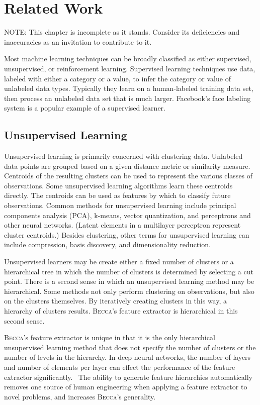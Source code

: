 \chapter{Related Work}

NOTE: This chapter is incomplete as it stands. Consider its deficiencies and inaccuracies as an invitation to contribute to it.

Most machine learning techniques can be broadly classified as either supervised, unsupervised, or reinforcement learning. Supervised learning techniques use data, labeled with either a category or a value, to infer the category or value of unlabeled data types. Typically they learn on a human-labeled training data set, then process an unlabeled data set that is much larger. Facebook's face labeling system is a popular example of a supervised learner.

\section{Unsupervised Learning}
Unsupervised learning is primarily concerned with clustering data. Unlabeled data points are grouped based on a given distance metric or similarity measure. Centroids of the resulting clusters can be used to represent the various classes of observations. Some unsupervised learning algorithms learn these centroids directly. The centroids can be used as features by which to classify future observations. Common methods for unsupervised learning include principal components analysis (PCA), k-means, vector quantization, and perceptrons and other neural networks. (Latent elements in a multilayer perceptron represent cluster centroids.) Besides clustering, other terms for unsupervised learning can include compression, basis discovery, and dimensionality reduction.

Unsupervised learners may be create either a fixed number of clusters or a hierarchical tree in which the number of clusters is determined by selecting a cut point. There is a second sense in which an unsupervised learning method may be hierarchical. Some methods not only perform clustering on observations, but also on the clusters themselves. By iteratively creating clusters in this way, a hierarchy of clusters results. \textsc{Becca}'s feature extractor is hierarchical in this second sense.

\textsc{Becca}'s feature extractor is unique in that it is the only hierarchical unsupervised learning method that does not specify the number of clusters or the number of levels in the hierarchy. In deep neural networks, the number of layers and number of elements per layer can effect the performance of the feature extractor significantly.~\cite{montavon11} The ability to generate feature hierarchies automatically removes one source of human engineering when applying a feature extractor to novel problems, and increases \textsc{Becca}'s generality.


